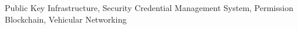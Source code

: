 \begin{abstract}

\end{abstract}

\vspace{0.1in}
\begin{IEEEkeywords}
Public Key Infrastructure, Security Credential Management System, Permission Blockchain, Vehicular Networking
\end{IEEEkeywords}